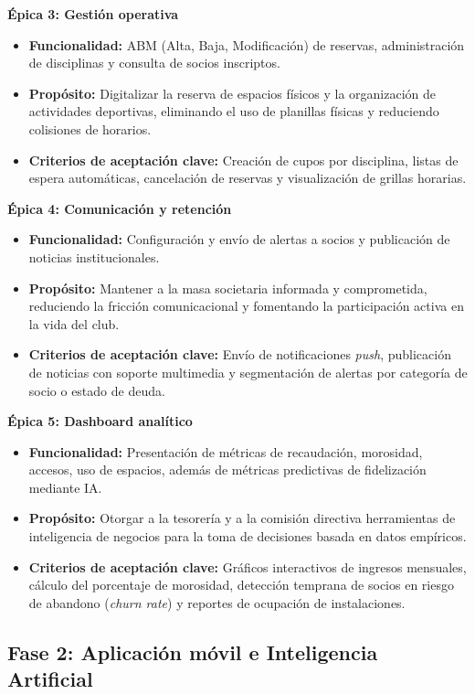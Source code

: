 \textbf{Épica 3: Gestión operativa}
\begin{itemize}
    \item \textbf{Funcionalidad:} ABM (Alta, Baja, Modificación) de reservas, administración de disciplinas y consulta de socios inscriptos.
    \item \textbf{Propósito:} Digitalizar la reserva de espacios físicos y la organización de actividades deportivas, eliminando el uso de planillas físicas y reduciendo colisiones de horarios.
    \item \textbf{Criterios de aceptación clave:} Creación de cupos por disciplina, listas de espera automáticas, cancelación de reservas y visualización de grillas horarias.
\end{itemize}

\textbf{Épica 4: Comunicación y retención}
\begin{itemize}
    \item \textbf{Funcionalidad:} Configuración y envío de alertas a socios y publicación de noticias institucionales.
    \item \textbf{Propósito:} Mantener a la masa societaria informada y comprometida, reduciendo la fricción comunicacional y fomentando la participación activa en la vida del club.
    \item \textbf{Criterios de aceptación clave:} Envío de notificaciones \textit{push}, publicación de noticias con soporte multimedia y segmentación de alertas por categoría de socio o estado de deuda.
\end{itemize}

\newpage

\textbf{Épica 5: Dashboard analítico}
\begin{itemize}
    \item \textbf{Funcionalidad:} Presentación de métricas de recaudación, morosidad, accesos, uso de espacios, además de métricas predictivas de fidelización mediante IA.
    \item \textbf{Propósito:} Otorgar a la tesorería y a la comisión directiva herramientas de inteligencia de negocios para la toma de decisiones basada en datos empíricos.
    \item \textbf{Criterios de aceptación clave:} Gráficos interactivos de ingresos mensuales, cálculo del porcentaje de morosidad, detección temprana de socios en riesgo de abandono (\textit{churn rate}) y reportes de ocupación de instalaciones.
\end{itemize}

\subsection{Fase 2: Aplicación móvil e Inteligencia Artificial}

